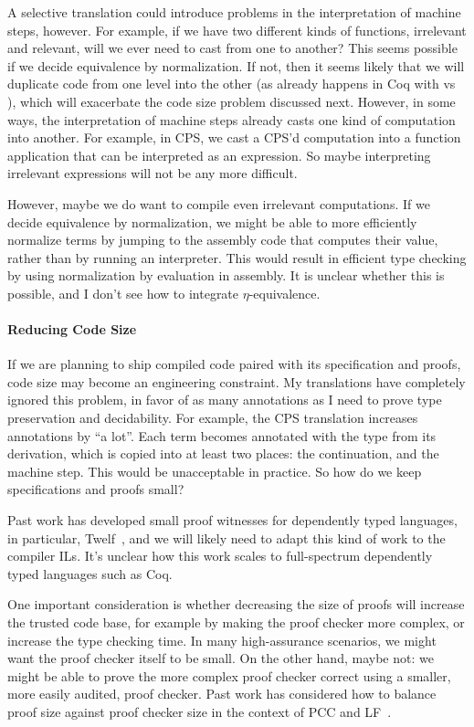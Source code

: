 A selective translation could introduce problems in the interpretation of
machine steps, however.
For example, if we have two different kinds of functions, irrelevant and
relevant, will we ever need to cast from one to another?
This seems possible if we decide equivalence by normalization.
If not, then it seems likely that we will duplicate code from one level into the
other (as already happens in Coq with  vs ),
which will exacerbate the code size problem discussed next.
However, in some ways, the interpretation of machine steps already casts one
kind of computation into another.
For example, in CPS, we cast a CPS'd computation into a function application
that can be interpreted as an expression.
So maybe interpreting irrelevant expressions will not be any more difficult.

However, maybe we do want to compile even irrelevant computations.
If we decide equivalence by normalization, we might be able to more efficiently
normalize terms by jumping to the assembly code that computes their value,
rather than by running an interpreter.
This would result in efficient type checking by using normalization by
evaluation in assembly.
It is unclear whether this is possible, and I don't see how to integrate
\(\eta\)-equivalence.

\paragraph{Reducing Code Size}
If we are planning to ship compiled code paired with its specification and
proofs, code size may become an engineering constraint.
My translations have completely ignored this problem, in favor of as many
annotations as I need to prove type preservation and decidability.
For example, the CPS translation increases annotations by ``a lot''.
Each term becomes annotated with the type from its derivation, which is copied
into at least two places: the continuation, and the machine step.
This would be unacceptable in practice.
So how do we keep specifications and proofs small?

Past work has developed small proof witnesses for dependently typed languages,
in particular, Twelf~\cite{sarkar2005}, and we will likely need to adapt this
kind of work to the compiler ILs.
It's unclear how this work scales to full-spectrum dependently typed languages
such as Coq.

One important consideration is whether decreasing the size of proofs will
increase the trusted code base, for example by making the proof checker more
complex, or increase the type checking time.
In many high-assurance scenarios, we might want the proof checker itself to be
small.
On the other hand, maybe not: we might be able to prove the more complex proof
checker correct using a smaller, more easily audited, proof checker.
Past work has considered how to balance proof size against proof checker size in
the context of PCC and LF~\cite{appel2003}.

